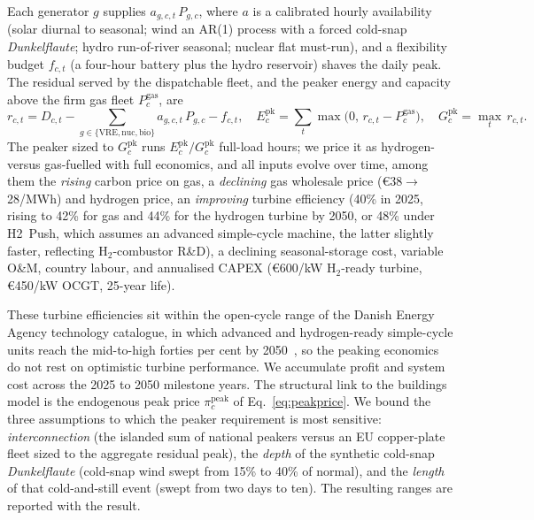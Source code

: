 Each generator $g$ supplies
$a_{g,c,t}\,P_{g,c}$, where $a$ is a calibrated hourly availability (solar diurnal
to seasonal; wind an AR(1) process with a forced cold-snap \emph{Dunkelflaute};
hydro run-of-river seasonal; nuclear flat must-run), and a flexibility budget
$f_{c,t}$ (a four-hour battery plus the hydro reservoir) shaves the daily peak. The
residual served by the dispatchable fleet, and the peaker energy and capacity above
the firm gas fleet $P^{\mathrm{gas}}_{c}$, are
%
\begin{equation}
\label{eq:dispatch}
    r_{c,t} = D_{c,t} - \!\!\sum_{g\in\{\mathrm{VRE,nuc,bio}\}}\!\!\! a_{g,c,t}\,P_{g,c} - f_{c,t},
    \quad
    E^{\mathrm{pk}}_{c} = \sum_{t}\max\!\bigl(0,\, r_{c,t}-P^{\mathrm{gas}}_{c}\bigr),
    \quad
    G^{\mathrm{pk}}_{c} = \max_{t}\,r_{c,t}.
\end{equation}
%
The peaker sized to $G^{\mathrm{pk}}_{c}$ runs $E^{\mathrm{pk}}_{c}/G^{\mathrm{pk}}_{c}$
full-load hours; we price it as hydrogen- versus gas-fuelled with full economics, and
all inputs evolve over time, among them the \emph{rising} carbon price on gas, a
\emph{declining} gas wholesale price (\euro{}38$\to$28/MWh) and hydrogen price, an
\emph{improving} turbine efficiency (40\% in 2025, rising to 42\% for gas and 44\% for
the hydrogen turbine by 2050, or 48\% under H2~Push, which assumes an advanced
simple-cycle machine, the latter slightly faster, reflecting H$_2$-combustor R\&D), a
declining seasonal-storage cost, variable O\&M, country labour, and annualised CAPEX
(\euro{}600/kW H$_2$-ready turbine, \euro{}450/kW OCGT, 25-year life).

These turbine efficiencies sit within the open-cycle range of the Danish Energy Agency
technology catalogue, in which advanced and hydrogen-ready simple-cycle units reach the
mid-to-high forties per cent by 2050~\citep{DEA2023technology}, so the peaking economics
do not rest on optimistic turbine performance. We accumulate profit and system cost
across the 2025 to 2050 milestone years. The structural link to the buildings model is
the endogenous peak price $\pi^{\mathrm{peak}}_{c}$ of Eq.~\eqref{eq:peakprice}. We
bound the three assumptions to which the peaker requirement is most sensitive:
\emph{interconnection} (the islanded sum of national peakers versus an EU copper-plate
fleet sized to the aggregate residual peak), the \emph{depth} of the synthetic cold-snap
\emph{Dunkelflaute} (cold-snap wind swept from 15\% to 40\% of normal), and the
\emph{length} of that cold-and-still event (swept from two days to ten). The resulting
ranges are reported with the result.

